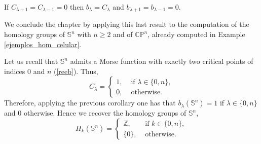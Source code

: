 \begin{corollary}
    If $C_{\lambda+1} = C_{\lambda-1} = 0$ then $b_{\lambda} = C_{\lambda}$ and $b_{\lambda+1} = b_{\lambda-1} = 0$.
\end{corollary}

We conclude the chapter by applying this last result to the computation of the homology groups of $\mathbb{S}^n$ with $n\ge 2$ and of $\mathbb{CP}^n$, already computed in Example \ref{ejemplos_hom_celular}.

Let us recall that $\mathbb{S}^n$ admits a Morse function with exactly two critical points of indices $0$ and $n$ (\ref{reeb}). Thus,
\begin{equation*}
    C_{\lambda}=
    \begin{cases}
        1, &\text{ if } \lambda \in \{0,n\},\\
        0, &\text{ otherwise.}
    \end{cases}
\end{equation*}
Therefore, applying the previous corollary one has that $b_{\lambda}(\mathbb{S}^n)=1$ if $\lambda \in \{0,n\}$ and $0$ otherwise. Hence we recover the homology groups of $\mathbb{S}^n$,
\begin{equation*}
    H_{k}(\mathbb{S}^n)=
    \begin{cases}
        \mathbb{Z}, &\text{ if } k \in \{0,n\},\\
        \{0\}, &\text{ otherwise.}
    \end{cases}
\end{equation*}

